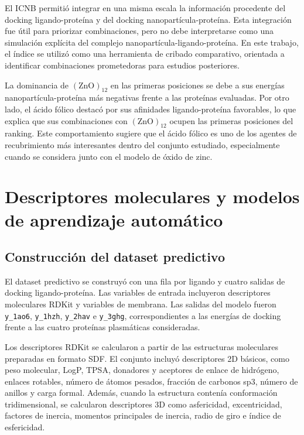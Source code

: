 \documentclass[
  spanish,
  a4paper,
  12pt,
  oneside,
  openany]{memoir}
\newcommand{\apendice}[1]{\chapter{#1}}
\begin{document}
El ICNB permitió integrar en una misma escala la información procedente
del docking ligando-proteína y del docking nanopartícula-proteína. Esta
integración fue útil para priorizar combinaciones, pero no debe
interpretarse como una simulación explícita del complejo
nanopartícula-ligando-proteína. En este trabajo, el índice se utilizó
como una herramienta de cribado comparativo, orientada a identificar
combinaciones prometedoras para estudios posteriores.

La dominancia de \((\mathrm{ZnO})_{12}\) en las primeras posiciones se
debe a sus energías nanopartícula-proteína más negativas frente a las
proteínas evaluadas. Por otro lado, el ácido fólico destacó por sus
afinidades ligando-proteína favorables, lo que explica que sus
combinaciones con \((\mathrm{ZnO})_{12}\) ocupen las primeras posiciones
del ranking. Este comportamiento sugiere que el ácido fólico es uno de
los agentes de recubrimiento más interesantes dentro del conjunto
estudiado, especialmente cuando se considera junto con el modelo de
óxido de zinc.

\apendice{Descriptores moleculares y modelos de aprendizaje automático}

\section{Construcción del dataset predictivo}

El dataset predictivo se construyó con una fila por ligando y cuatro
salidas de docking ligando-proteína. Las variables de entrada incluyeron
descriptores moleculares RDKit y variables de membrana. Las salidas del
modelo fueron \texttt{y\_1ao6}, \texttt{y\_1hzh}, \texttt{y\_2hav} e
\texttt{y\_3ghg}, correspondientes a las energías de docking frente a
las cuatro proteínas plasmáticas consideradas.

Los descriptores RDKit se calcularon a partir de las estructuras
moleculares preparadas en formato SDF. El conjunto incluyó descriptores
2D básicos, como peso molecular, LogP, TPSA, donadores y aceptores de
enlace de hidrógeno, enlaces rotables, número de átomos pesados,
fracción de carbonos sp3, número de anillos y carga formal. Además,
cuando la estructura contenía conformación tridimensional, se calcularon
descriptores 3D como asfericidad, excentricidad, factores de inercia,
momentos principales de inercia, radio de giro e índice de esfericidad.
\end{document}

